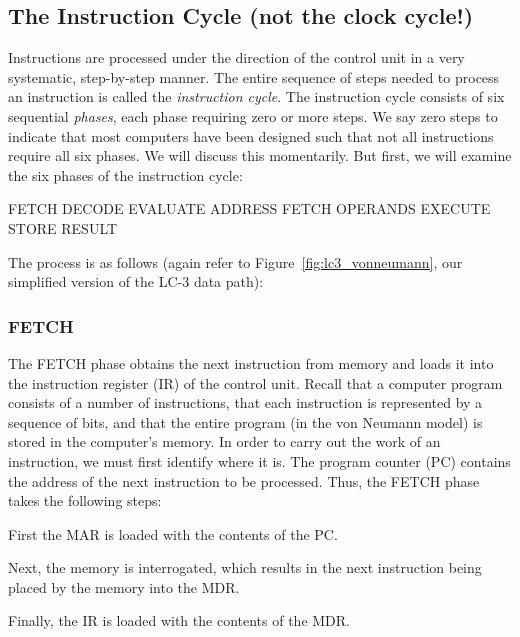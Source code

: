 \documentclass{patt}
\begin{document}
\subsection{The Instruction Cycle (not the clock cycle!)}
Instructions are processed under the direction of the control
unit in a very systematic, step-by-step manner.
The entire sequence of steps needed to process an instruction is called 
the {\em instruction cycle}.
The instruction cycle consists of six sequential {\em phases}, each phase 
requiring zero or more steps.  We say zero steps to indicate that 
most computers have been designed such that not all
instructions require all six phases.  We will discuss this momentarily.
But first, we will examine the six phases of the instruction cycle:

\begin{colorverbatim}
      FETCH
      DECODE
      EVALUATE ADDRESS
      FETCH OPERANDS
      EXECUTE
      STORE RESULT
\end{colorverbatim}

The process is as follows (again refer to Figure~\ref{fig:lc3_vonneumann}, our 
simplified version of the LC-3 data path):

\subsubsection{FETCH}
The FETCH phase obtains the next instruction from memory and loads it into the
instruction register (IR) of the control unit.  Recall that a computer program
consists of a number of instructions, that each instruction is represented
by a sequence of bits, and that the
entire program (in the von Neumann model) is
stored in the computer's memory.  In order to carry out the work of an
instruction, we must first identify where it is.
The program counter (PC) contains
the address of the next instruction to be processed.
Thus, the FETCH phase takes the following steps:

\vspace{3pt}

\begin{verblist}
\item[] First the MAR is loaded with the contents of the PC.

\item[] Next, the memory is interrogated, which results
in the next instruction being placed by the memory
into the MDR.

\item[] Finally, the IR is loaded with the contents
of the MDR.
\end{verblist}
\end{document}
